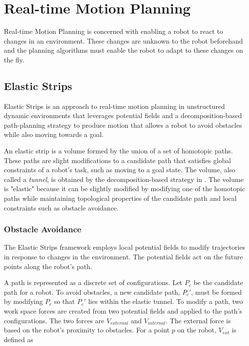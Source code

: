 \documentclass[10pt,conference]{ieeeconf}
\begin{document}


\section{Real-time Motion Planning} \label{sec:real-time}

Real-time Motion Planning is concerned with enabling a robot to react to changes in an environment. These changes are unknown to the robot beforehand and the planning algorithms must enable the robot to adapt to these changes on the fly.

\subsection{Elastic Strips} \label{sec:elastic}

Elastic Strips \cite{brock2002elastic} is an approach to real-time motion planning in unstructured dynamic environments that leverages potential fields and a decomposition-based path-planning strategy \cite{brock2001decomposition} to produce motion that allows a robot to avoid obstacles while also moving towards a goal.

An elastic strip is a volume formed by the union of a set of homotopic paths. These paths are slight modifications to a candidate path that satisfies global constraints of a robot's task, such as moving to a goal state. The volume, also called a \emph{tunnel}, is obtained by the decomposition-based strategy in \cite{brock2001decomposition}. The volume is "elastic" because it can be slightly modified by modifying one of the homotopic paths while maintaining topological properties of the candidate path and local constraints such as obstacle avoidance. 


\subsubsection{Obstacle Avoidance}

The Elastic Strips framework employs local potential fields to modify trajectories in response to changes in the environment. The potential fields act on the future points along the robot's path.

A path is represented as a discrete set of configurations. Let $P_c$ be the candidate path for a robot. To avoid obstacles, a new candidate path, $P_c'$, must be formed by modifying $P_c$ so that $P_c'$ lies within the elastic tunnel. To modify a path, two work space forces are created from two potential fields and applied to the path's configurations. The two forces are $V_{external}$ and $V_{internal}$. The external force is based on the robot's proximity to obstacles. For a point $p$ on the robot, $V_{ext}$ is defined as
\end{document}
